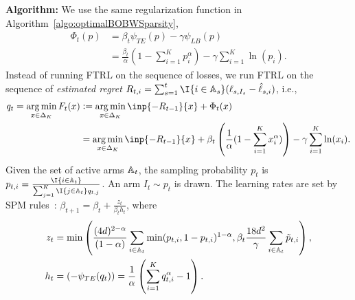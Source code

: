 \textbf{Algorithm:} 
We use the same regularization function in Algorithm~\ref{algo:optimalBOBWSparsity},
\begin{align*}
    \Phi_t(p) &= \beta_t\psi_{TE}(p) - \gamma \psi_{LB}(p) \\
    &= \frac{\beta_t}{\alpha}\left(1 - \sum_{i=1}^K p_i^{\alpha}\right) - \gamma\sum_{i=1}^K \ln(p_i).
\end{align*}
Instead of running FTRL on the sequence of losses, we run FTRL on the sequence of \emph{estimated regret} $R_{t,i} = \sum_{s=1}^t \I{i \in \sA_s}(\ell_{s,I_s} - \hat{\ell}_{s,i})$, i.e., 
\begin{align*}
    q_t = \argmin_{x \in \Delta_K}F_t(x) &\defeq \argmin_{x \in \Delta_K} \inp{-R_{t-1}}{x} + \Phi_t(x) \\
    &= \argmin_{x \in \Delta_K} \inp{-R_{t-1}}{x} + \beta_t\left(\frac{1}{\alpha}(1-\sum_{i=1}^K x_i^\alpha)\right) - \gamma\sum_{i=1}^K \ln(x_i).
\end{align*}
Given the set of active arms ${\mathbb{A}}_t$, the sampling probability $p_t$ is $p_{t,i} = \frac{\I{i \in \sA_t}}{\sum_{j=1}^K \I{j \in \sA_t}q_{t,j}}$. An arm $I_t \sim p_t$ is drawn.
The learning rates are set by SPM rules~\citep{ItoCOLT2024}: $\beta_{t+1} = \beta_t + \frac{z_t}{\beta_t h_t}$, where 
\begin{align*}
    z_t &= \min\left(\frac{(4d)^{2-\alpha}}{(1-\alpha)}\sum_{i \in {\mathbb{A}}_t}\min(p_{t,i}, 1-p_{t,i})^{1-\alpha}, \beta_t\frac{18d^2 }{\gamma}\sum_{i \in {\mathbb{A}}_t}\tilde{p}_{t,i}\right), \\
    h_{t} &= (-\psi_{TE}(q_t)) = \frac{1}{\alpha}\left(\sum_{i=1}^K q_{t,i}^{\alpha} - 1\right).
\end{align*}



